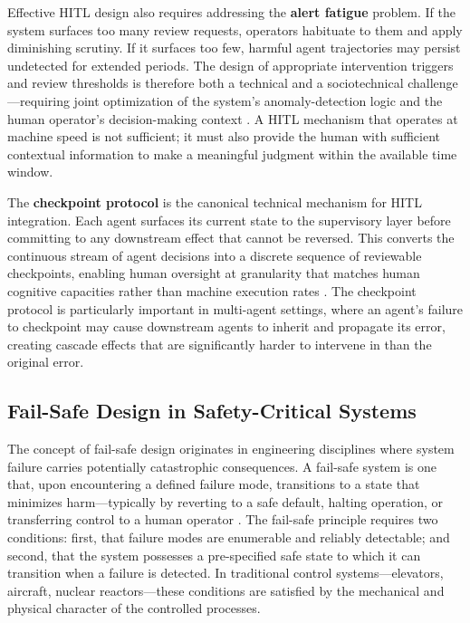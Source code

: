 Effective HITL design also requires addressing the \textbf{alert fatigue} problem. If the system surfaces too many review requests, operators habituate to them and apply diminishing scrutiny. If it surfaces too few, harmful agent trajectories may persist undetected for extended periods. The design of appropriate intervention triggers and review thresholds is therefore both a technical and a sociotechnical challenge—requiring joint optimization of the system's anomaly-detection logic and the human operator's decision-making context \cite{tristr81}. A HITL mechanism that operates at machine speed is not sufficient; it must also provide the human with sufficient contextual information to make a meaningful judgment within the available time window.

The \textbf{checkpoint protocol} is the canonical technical mechanism for HITL integration. Each agent surfaces its current state to the supervisory layer before committing to any downstream effect that cannot be reversed. This converts the continuous stream of agent decisions into a discrete sequence of reviewable checkpoints, enabling human oversight at granularity that matches human cognitive capacities rather than machine execution rates \cite{dijkstra1982}. The checkpoint protocol is particularly important in multi-agent settings, where an agent's failure to checkpoint may cause downstream agents to inherit and propagate its error, creating cascade effects that are significantly harder to intervene in than the original error.

\subsection{Fail-Safe Design in Safety-Critical Systems}

The concept of fail-safe design originates in engineering disciplines where system failure carries potentially catastrophic consequences. A fail-safe system is one that, upon encountering a defined failure mode, transitions to a state that minimizes harm—typically by reverting to a safe default, halting operation, or transferring control to a human operator \cite{tristr81}. The fail-safe principle requires two conditions: first, that failure modes are enumerable and reliably detectable; and second, that the system possesses a pre-specified safe state to which it can transition when a failure is detected. In traditional control systems—elevators, aircraft, nuclear reactors—these conditions are satisfied by the mechanical and physical character of the controlled processes.

